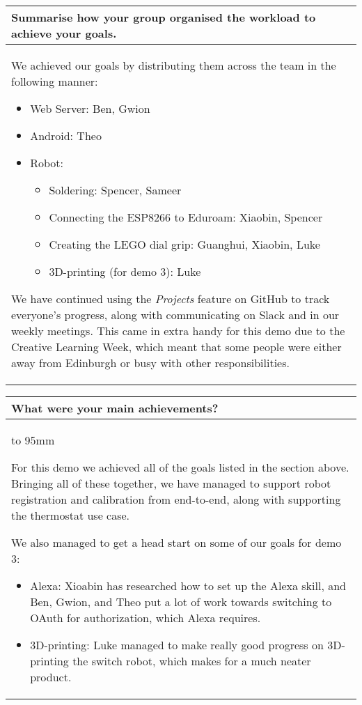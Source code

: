 \documentclass[a4paper]{article}
\newcommand{\colWidth}{141mm}
\begin{document}
\begin{center}
\begin{tabular}{|p{\colWidth}|}
	\hline
\end{tabular}
\vskip 5mm


\begin{tabular}{|p{\colWidth}|}
	\hline
	\cellcolor{blue!25}\large
	\textbf{Summarise how your group organised the workload to achieve your goals.}
	\\ \hline
	
		We achieved our goals by distributing them across the team in the following manner:
		\begin{itemize}
			\item Web Server: Ben, Gwion
			\item Android: Theo
			\item Robot:
			\begin{itemize}
				\item Soldering: Spencer, Sameer
				\item Connecting the ESP8266 to Eduroam: Xiaobin, Spencer
				\item Creating the LEGO dial grip: Guanghui, Xiaobin, Luke
				\item 3D-printing (for demo 3): Luke
			\end{itemize}
		\end{itemize}

		We have continued using the \textit{Projects} feature on GitHub to track everyone's progress, along with communicating on Slack and in our weekly meetings.
		This came in extra handy for this demo due to the Creative Learning Week, which meant that some people were either away from Edinburgh or busy with other responsibilities.
	
  \\
  \hline
\end{tabular}
\vskip 5mm


\begin{tabular}{|p{\colWidth}|}
	\hline
	\cellcolor{blue!25}\large
	\textbf{What were your main achievements?}
	\\ \hline
	\vtop to 95mm{
		For this demo we achieved all of the goals listed in the section above. Bringing all of these together, we have
		managed to support robot registration and calibration from end-to-end, along with supporting the thermostat use case.

		\vspace{2mm}

		We also managed to get a head start on some of our goals for demo 3:
		\begin{itemize}
			\item Alexa: Xioabin has researched how to set up the Alexa skill, and Ben, Gwion, and Theo put a lot of work towards switching to OAuth for authorization, which Alexa requires.
			\item 3D-printing: Luke managed to make really good progress on 3D-printing the switch robot, which makes for a much neater product.
		\end{itemize}
	}
  \\
  \hline
\end{tabular}
\vskip 5mm


\end{center}
\end{document}
